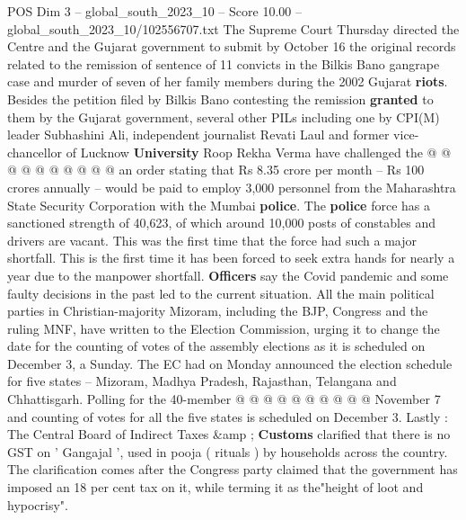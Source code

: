 \begin{textsample}{POS Dim 3 – global\_south\_2023\_10 – Score 10.00 – global\_south\_2023\_10/102556707.txt}
The Supreme Court Thursday directed the Centre and the Gujarat government to submit by October 16 the original records related to the remission of sentence of 11 convicts in the Bilkis Bano gangrape case and murder of seven of her family members during the 2002 Gujarat \textbf{riots}.
Besides the petition filed by Bilkis Bano contesting the remission \textbf{granted} to them by the Gujarat government, several other PILs including one by CPI(M) leader Subhashini Ali, independent journalist Revati Laul and former vice-chancellor of Lucknow \textbf{University} Roop Rekha Verma have challenged the @ @ @ @ @ @ @ @ @ @ an order stating that Rs 8.35 crore per month -- Rs 100 crores annually -- would be paid to employ 3,000 personnel from the Maharashtra State Security Corporation with the Mumbai \textbf{police}.
The \textbf{police} force has a sanctioned strength of 40,623, of which around 10,000 posts of constables and drivers are vacant.
This was the first time that the force had such a major shortfall.
This is the first time it has been forced to seek extra hands for nearly a year due to the manpower shortfall. \textbf{Officers} say the Covid pandemic and some faulty decisions in the past led to the current situation.
All the main political parties in Christian-majority Mizoram, including the BJP, Congress and the ruling MNF, have written to the Election Commission, urging it to change the date for the counting of votes of the assembly elections as it is scheduled on December 3, a Sunday.
The EC had on Monday announced the election schedule for five states -- Mizoram, Madhya Pradesh, Rajasthan, Telangana and Chhattisgarh.
Polling for the 40-member @ @ @ @ @ @ @ @ @ @ November 7 and counting of votes for all the five states is scheduled on December 3.
Lastly : The Central Board of Indirect Taxes \&amp ; \textbf{Customs} clarified that there is no GST on ' Gangajal ', used in pooja ( rituals ) by households across the country.
The clarification comes after the Congress party claimed that the government has imposed an 18 per cent tax on it, while terming it as the"height of loot and hypocrisy".

\end{textsample}
